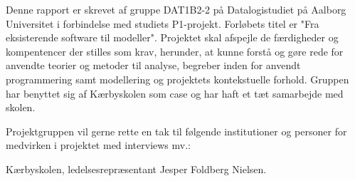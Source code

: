 Denne rapport er skrevet af gruppe DAT1B2-2 på Datalogistudiet på Aalborg Universitet i forbindelse med studiets P1-projekt. Forløbets titel er "Fra eksisterende software til modeller". Projektet skal afspejle de færdigheder og kompentencer der stilles som krav, herunder, at kunne forstå og gøre rede for anvendte teorier og metoder til analyse, begreber inden for anvendt programmering samt modellering og projektets kontekstuelle forhold. Gruppen har benyttet sig af Kærbyskolen som case og har haft et tæt samarbejde med skolen.

Projektgruppen vil gerne rette en tak til følgende institutioner og personer for medvirken i projektet med interviews mv.:

Kærbyskolen, ledelsesrepræsentant Jesper Foldberg Nielsen.